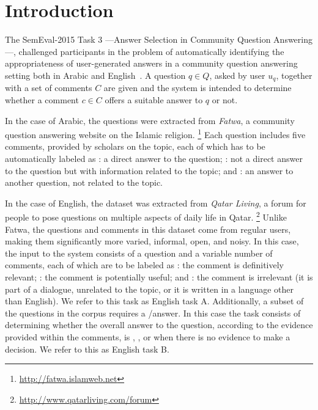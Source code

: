 \section{Introduction}
\label{sec:intro}


The SemEval-2015 Task 3 ---Answer Selection in Community Question Answering---, 
challenged participants in the problem of automatically identifying the 
appropriateness of user-generated answers in a community question answering 
setting both in Arabic and English~\cite{Marquez-EtAl:2015:SemEval}. A question 
$q\in Q$, asked by user $u_q$, together with a set of comments $C$ are given and 
the system is intended to determine whether a comment $c\in C$ offers a suitable 
answer to $q$ or not. 

In the case of Arabic, the questions were extracted from \textit{Fatwa}, a 
community question answering website on the Islamic religion.%
\footnote{\url{http://fatwa.islamweb.net}} 
Each question includes five comments, provided by scholars on 
the topic, each of which has to be automatically labeled as 
\Ni \dir: a direct answer to the question;
\Nii \rel: not a direct answer to the question but with information related to 
the topic; and 
\Niii \irel: an answer to another question, not related to the topic. 

In the case of English, the dataset was extracted from \textit{Qatar Living}, 
a forum for people to pose questions on multiple aspects of daily life in 
Qatar.%
\footnote{\url{http://www.qatarliving.com/forum}}
Unlike Fatwa, the questions and comments in this dataset come from regular 
users, making them significantly more varied, informal, open, and noisy. In 
this case, the input to the system consists of a question and a variable number 
of comments, each of which are to be labeled as 
\Ni \good: the comment is definitively relevant; 
\Nii \pot: the comment is potentially useful; and 
\Niii \bad: the comment is irrelevant (\eg it is part of a dialogue, unrelated 
to the topic, or it is written in a language other than English). 
We refer to this task as English task A. Additionally, a subset of the questions 
in the corpus requires a \yes/\no answer.
In this case the task consists of determining whether the overall answer to the 
question, according to the evidence provided within the comments, is 
\Ni \yes, 
\Nii \no, or 
\Niii \unsure when there is no evidence to make a decision. 
We refer to this as English task B. 

